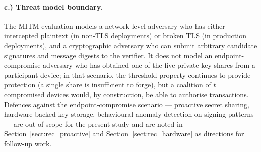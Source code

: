 \paragraph{c.) Threat model boundary.}
The MITM evaluation models a network-level adversary who has either intercepted plaintext (in non-TLS deployments) or broken TLS (in production deployments), and a cryptographic adversary who can submit arbitrary candidate signatures and message digests to the verifier. It does not model an endpoint-compromise adversary who has obtained one of the five private key shares from a participant device; in that scenario, the threshold property continues to provide protection (a single share is insufficient to forge), but a coalition of $t$ compromised devices would, by construction, be able to authorise transactions. Defences against the endpoint-compromise scenario --- proactive secret sharing, hardware-backed key storage, behavioural anomaly detection on signing patterns --- are out of scope for the present study and are noted in Section~\ref{sect:rec_proactive} and Section~\ref{sect:rec_hardware} as directions for follow-up work.
